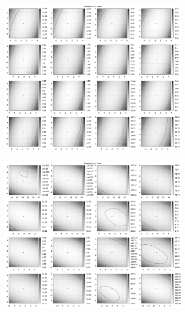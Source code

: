 \begin{figure}[!ht]
\begin{subfigure}[t]{0.4\textwidth}
	 \end{subfigure}
\\
\vspace{5mm}
     \begin{subfigure}[t]{0.4\textwidth}
			\centering
			\includegraphics[width=\textwidth]{img/fitness/xz_a0zoomed.png}
	 \end{subfigure}
	 \qquad
     \begin{subfigure}[t]{0.4\textwidth}
			\centering
			\includegraphics[width=\textwidth]{img/fitness/yz_a0zoomed.png}
	 \end{subfigure}      
\end{figure}
